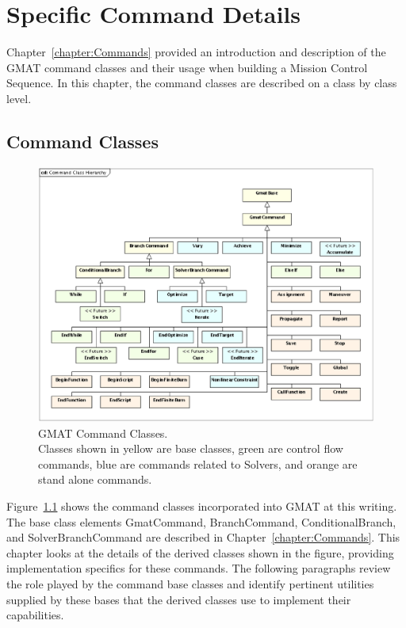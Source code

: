 \chapter{\label{chapter:SpecificCommands}Specific Command Details}

Chapter~\ref{chapter:Commands} provided an introduction and description of the GMAT command classes
and their usage when building a Mission Control Sequence.  In this chapter, the command
classes are described on a class by class level.

\section{\label{section:CommandClasses}Command Classes}

\begin{figure}[htb]
\begin{center}
\includegraphics[scale=0.5]{Images/CommandClassHierarchy.eps}
\caption[GMAT Command Classes]{\label{figure:CommandClassDiagram}GMAT Command Classes.\\Classes
shown in yellow are base classes, green are control flow commands, blue are commands related to
Solvers, and orange are stand alone commands.}
\end{center}
\end{figure}

Figure~\ref{figure:CommandClassDiagram} shows the command classes incorporated into GMAT at this
writing.  The base class elements GmatCommand, BranchCommand, ConditionalBranch, and
SolverBranchCommand are described in Chapter~\ref{chapter:Commands}.  This chapter looks at the
details of the derived classes shown in the figure, providing implementation specifics for these
commands.  The following paragraphs review the role played by the command base classes and identify
pertinent utilities supplied by these bases that the derived classes use to implement their
capabilities.

